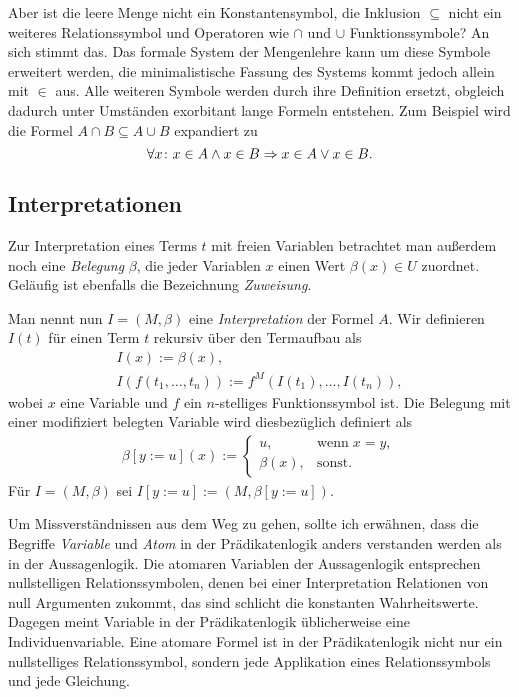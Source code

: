 Aber ist die leere Menge nicht ein Konstantensymbol, die Inklusion
${\subseteq}$ nicht ein weiteres Relationssymbol und Operatoren wie
$\cap$ und $\cup$ Funktionssymbole? An sich stimmt das. Das
formale System der Mengenlehre kann um diese Symbole erweitert werden,
die minimalistische Fassung des Systems kommt jedoch allein mit
${\in}$ aus. Alle weiteren Symbole werden durch ihre Definition
ersetzt, obgleich dadurch unter Umständen exorbitant lange Formeln
entstehen. Zum Beispiel wird die Formel $A\cap B\subseteq A\cup B$
expandiert zu
\[\forall x\colon x\in A\land x\in B\Rightarrow x\in A\lor x\in B.\]

\subsection{Interpretationen}

Zur Interpretation eines Terms $t$ mit freien Variablen betrachtet
man außerdem noch eine \emph{Belegung} $\beta$, die jeder Variablen $x$
einen Wert $\beta(x)\in U$ zuordnet. Geläufig ist ebenfalls die
Bezeichnung \emph{Zuweisung}.

Man nennt nun $I=(M,\beta)$ eine \emph{Interpretation} der Formel $A$.
Wir definieren $I(t)$ für einen Term $t$ rekursiv über den Termaufbau
als%
\begin{gather*}
I(x) := \beta(x),\\
I(f(t_1,\ldots,t_n)) := f^M(I(t_1),\ldots,I(t_n)),
\end{gather*}
wobei $x$ eine Variable und $f$ ein $n$-stelliges Funktionssymbol
ist. Die Belegung mit einer modifiziert belegten Variable wird
diesbezüglich definiert als%
\begin{gather*}
\beta[y{:=}u](x) := \begin{cases}
u, & \text{wenn}\;x=y,\\
\beta(x), & \text{sonst}.
\end{cases}
\end{gather*}
Für $I=(M,\beta)$ sei $I[y{:=}u] := (M,\beta[y{:=}u])$.

Um Missverständnissen aus dem Weg zu gehen, sollte ich erwähnen, dass
die Begriffe \emph{Variable} und \emph{Atom} in der Prädikatenlogik
anders verstanden werden als in der Aussagenlogik. Die atomaren
Variablen der Aussagenlogik entsprechen nullstelligen Relationssymbolen,
denen bei einer Interpretation Relationen von null Argumenten zukommt,
das sind schlicht die konstanten Wahrheitswerte. Dagegen meint Variable
in der Prädikatenlogik üblicherweise eine Individuenvariable. Eine
atomare Formel ist in der Prädikatenlogik nicht nur ein nullstelliges
Relationssymbol, sondern jede Applikation eines Relationssymbols und
jede Gleichung.

